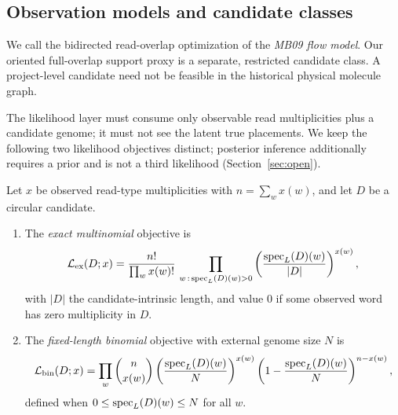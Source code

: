 \subsection{Observation models and candidate classes}

We call the bidirected read-overlap optimization
of \textcite[\S6.2]{medvedev2009} the \emph{MB09 flow model}. Our oriented full-overlap support proxy is a separate,
restricted candidate class. A project-level candidate need not
be feasible in the historical physical molecule graph.

The likelihood layer must consume only observable read multiplicities plus a
candidate genome; it must not see the latent true placements. We keep the
following two likelihood objectives distinct; posterior inference additionally
requires a prior and is not a third likelihood (Section~\ref{sec:open}).

\begin{definition}
\label{def:likelihoods}
Let $x$ be observed read-type multiplicities with $n=\sum_w x(w)$, and let $D$ be
a circular candidate.
\begin{enumerate}[label=(\roman*),leftmargin=*]
  \item The \emph{exact multinomial} objective is
  \[
    \mathcal{L}_{\mathrm{ex}}(D;x)
      = \frac{n!}{\prod_w x(w)!}\,
        \prod_{w\,:\,\operatorname{spec}_L(D)(w)>0}
        \left(\frac{\operatorname{spec}_L(D)(w)}{|D|}\right)^{x(w)},
  \]
  with $|D|$ the candidate-intrinsic length, and value $0$ if some observed
  word has zero multiplicity in $D$.
  \item The \emph{fixed-length binomial} objective with external genome size $N$
  is
  \[
    \mathcal{L}_{\mathrm{bin}}(D;x)
      = \prod_w \binom{n}{x(w)}
        \left(\frac{\operatorname{spec}_L(D)(w)}{N}\right)^{x(w)}
        \left(1-\frac{\operatorname{spec}_L(D)(w)}{N}\right)^{n-x(w)},
  \]
  defined when $0 \le \operatorname{spec}_L(D)(w) \le N$ for all $w$.
\end{enumerate}
\end{definition}

